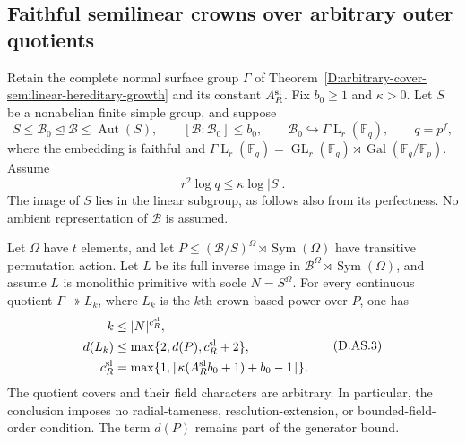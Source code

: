 \subsection{Faithful semilinear crowns over arbitrary outer quotients}

\begin{corollary}
\label{D:arbitrary-quotient-faithful-semilinear-crowns}
Retain the complete normal surface group $\Gamma$ of
Theorem~\ref{D:arbitrary-cover-semilinear-hereditary-growth}
and its constant $A_R^{\rm sl}$. Fix $b_0\ge1$ and
$\kappa>0$. Let $S$ be a nonabelian finite simple group,
and suppose
\[
 S\le\mathcal B_0\mathrel{\trianglelefteq}\mathcal B
       \le\operatorname{Aut}(S),\qquad
 [\mathcal B:\mathcal B_0]\le b_0,
 \qquad
 \mathcal B_0\hookrightarrow
      \Gamma\operatorname{L}_r(\mathbb F_q),\qquad q=p^f,
                                                            \tag{D.AS.1}
\]
where the embedding is faithful and
$\Gamma\operatorname{L}_r(\mathbb F_q)
=\operatorname{GL}_r(\mathbb F_q)\rtimes
\operatorname{Gal}(\mathbb F_q/\mathbb F_p)$.
Assume
\[
                       r^2\log q\le\kappa\log|S|.        \tag{D.AS.2}
\]
The image of $S$ lies in the linear subgroup, as follows
also from its perfectness. No ambient representation of
$\mathcal B$ is assumed.

Let $\Omega$ have $t$ elements, and let
$P\le(\mathcal B/S)^\Omega\rtimes\operatorname{Sym}(\Omega)$
have transitive permutation action. Let $L$ be its full
inverse image in
$\mathcal B^\Omega\rtimes\operatorname{Sym}(\Omega)$,
and assume $L$ is monolithic primitive with socle
$N=S^\Omega$. For every continuous quotient
$\Gamma\twoheadrightarrow L_k$, where $L_k$ is the
$k$th crown-based power over $P$, one has
\[
 \begin{split}
 k&\le |N|^{c_R^{\rm sl}},\\
 d(L_k)&\le\max\{2,d(P),c_R^{\rm sl}+2\},\\
 c_R^{\rm sl}
   &=\max\{1,\lceil
           \kappa(A_R^{\rm sl}b_0+1)+b_0-1\rceil\}.
 \end{split}                                               \tag{D.AS.3}
\]
The quotient covers and their field characters are arbitrary.
In particular, the conclusion imposes no radial-tameness,
resolution-extension, or bounded-field-order condition.
The term $d(P)$ remains part of the generator bound.
\end{corollary}

